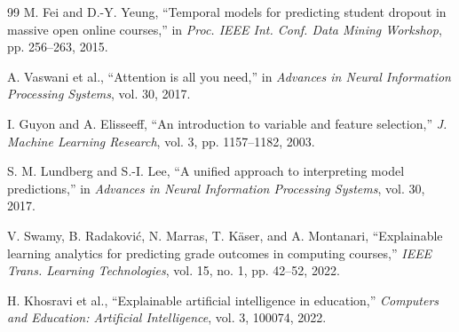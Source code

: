 \documentclass[journal]{IEEEtran}
\begin{document}
\begin{thebibliography}{99}
M. Fei and D.-Y. Yeung, ``Temporal models for predicting student dropout in massive open online courses,'' in \textit{Proc. IEEE Int. Conf. Data Mining Workshop}, pp. 256--263, 2015.

A. Vaswani et al., ``Attention is all you need,'' in \textit{Advances in Neural Information Processing Systems}, vol. 30, 2017.

I. Guyon and A. Elisseeff, ``An introduction to variable and feature selection,'' \textit{J. Machine Learning Research}, vol. 3, pp. 1157--1182, 2003.

S. M. Lundberg and S.-I. Lee, ``A unified approach to interpreting model predictions,'' in \textit{Advances in Neural Information Processing Systems}, vol. 30, 2017.

V. Swamy, B. Radaković, N. Marras, T. Käser, and A. Montanari, ``Explainable learning analytics for predicting grade outcomes in computing courses,'' \textit{IEEE Trans. Learning Technologies}, vol. 15, no. 1, pp. 42--52, 2022.

H. Khosravi et al., ``Explainable artificial intelligence in education,'' \textit{Computers and Education: Artificial Intelligence}, vol. 3, 100074, 2022.

\end{thebibliography}
\end{document}
